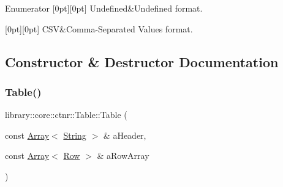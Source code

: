 \begin{DoxyEnumFields}{Enumerator}
[0pt][0pt]{}\mbox{\label{classlibrary_1_1core_1_1ctnr_1_1_table_ab1d81689432c3a6bc960d33db1e11a4caec0fc0100c4fc1ce4eea230c3dc10360}} 
Undefined&Undefined format. \\
\hline

[0pt][0pt]{}\mbox{\label{classlibrary_1_1core_1_1ctnr_1_1_table_ab1d81689432c3a6bc960d33db1e11a4cacc8d68c551c4a9a6d5313e07de4deafd}} 
C\+SV&Comma-\/\+Separated Values format. \\
\hline

\end{DoxyEnumFields}


\subsection{Constructor \& Destructor Documentation}
\mbox{\label{classlibrary_1_1core_1_1ctnr_1_1_table_a5b11121caa4288c3da642af7c6a5a632}} 
\subsubsection{\texorpdfstring{Table()}{Table()}\hspace{0.1cm}{\footnotesize\ttfamily [1/3]}}
{\footnotesize\ttfamily library\+::core\+::ctnr\+::\+Table\+::\+Table (\begin{DoxyParamCaption}\item[{const \mbox{\hyperlink{classlibrary_1_1core_1_1ctnr_1_1_array}{Array}}$<$ \mbox{\hyperlink{classlibrary_1_1core_1_1types_1_1_string}{String}} $>$ \&}]{a\+Header,  }\item[{const \mbox{\hyperlink{classlibrary_1_1core_1_1ctnr_1_1_array}{Array}}$<$ \mbox{\hyperlink{classlibrary_1_1core_1_1ctnr_1_1table_1_1_row}{Row}} $>$ \&}]{a\+Row\+Array }\end{DoxyParamCaption})}




